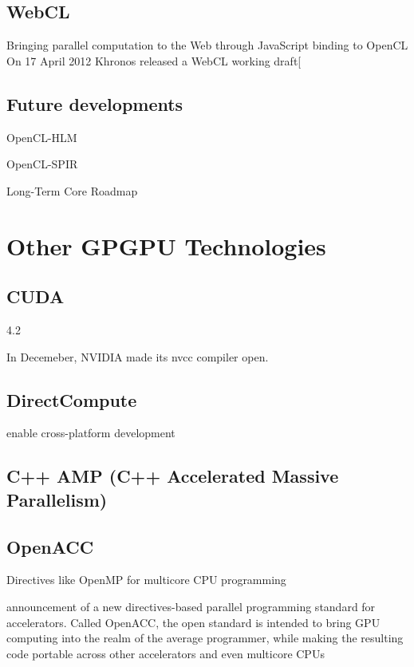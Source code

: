
\subsection{WebCL}
Bringing parallel computation to the Web through JavaScript binding to OpenCL
On 17 April 2012 Khronos released a WebCL working draft[

\subsection{Future developments}
OpenCL-HLM

OpenCL-SPIR

Long-Term Core Roadmap


\section{Other GPGPU Technologies}
\subsection{CUDA}

4.2

In Decemeber, NVIDIA made its nvcc compiler open.

\subsection{DirectCompute}
enable cross-platform development

\subsection{C++ AMP (C++ Accelerated Massive Parallelism)}


\subsection{OpenACC}
Directives like OpenMP for multicore CPU programming

announcement of a new directives-based parallel programming standard for accelerators.  Called OpenACC, the open standard is intended to bring GPU computing into the realm of the average programmer, while making the resulting code portable across other accelerators and even multicore CPUs

